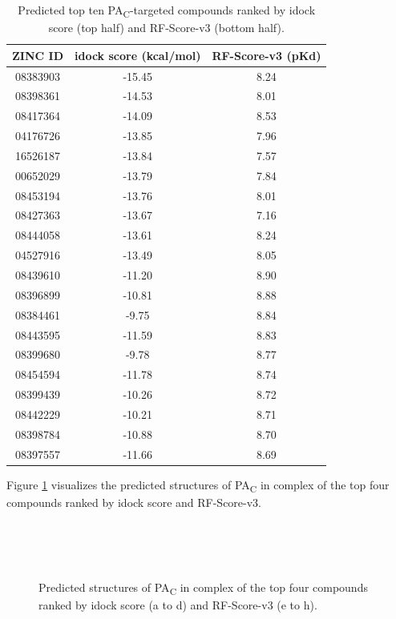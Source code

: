 \begin{table}
\caption{Predicted top ten PA\textsubscript{C}-targeted compounds ranked by idock score (top half) and RF-Score-v3 (bottom half).}
\label{influenza:2ZNL-Hits-10}
\begin{tabular}{ccc}
\hline
ZINC ID & idock score (kcal/mol) & RF-Score-v3 (pKd)\\
\hline
08383903 & -15.45 & 8.24\\
08398361 & -14.53 & 8.01\\
08417364 & -14.09 & 8.53\\
04176726 & -13.85 & 7.96\\
16526187 & -13.84 & 7.57\\
00652029 & -13.79 & 7.84\\
08453194 & -13.76 & 8.01\\
08427363 & -13.67 & 7.16\\
08444058 & -13.61 & 8.24\\
04527916 & -13.49 & 8.05\\
\hline
08439610 & -11.20 & 8.90\\
08396899 & -10.81 & 8.88\\
08384461 &  -9.75 & 8.84\\
08443595 & -11.59 & 8.83\\
08399680 &  -9.78 & 8.77\\
08454594 & -11.78 & 8.74\\
08399439 & -10.26 & 8.72\\
08442229 & -10.21 & 8.71\\
08398784 & -10.88 & 8.70\\
08397557 & -11.66 & 8.69\\
\hline
\end{tabular}
\end{table}

Figure \ref{influenza:2ZNL-Hits-4} visualizes the predicted structures of PA\textsubscript{C} in complex of the top four compounds ranked by idock score and RF-Score-v3.

\begin{figure}
\centering
{}
\\
\\
\\
\caption{Predicted structures of PA\textsubscript{C} in complex of the top four compounds ranked by idock score (a to d) and RF-Score-v3 (e to h).}
\label{influenza:2ZNL-Hits-4}
\end{figure}

